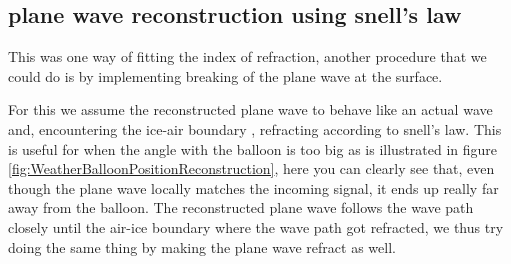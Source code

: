 \subsection{plane wave reconstruction using snell's law}
\label{seq:SnellPW}
This was one way of fitting the index of refraction, another procedure
that we could do is by implementing breaking of the plane wave at 
the surface. 

For this we assume the reconstructed plane wave to behave like an actual wave
and, encountering the ice-air boundary , refracting according to snell's law.
This is useful for when the angle with the balloon is too big as is illustrated
in figure \ref{fig:WeatherBalloonPositionReconstruction}, here you can clearly
see that, even though the plane wave locally matches the incoming signal, it
ends up really far away from the balloon. The reconstructed plane wave follows the
wave path closely until the air-ice boundary where the wave path got refracted,
we thus try doing the same thing by making the plane wave refract as well.

